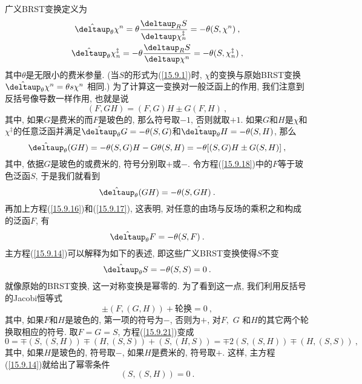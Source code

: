 广义BRST变换定义为
\begin{gather}
\hat{\deltaup}_{\theta }\chi ^{n}=\theta \frac{\deltaup _{R}S}{\deltaup \chi
_{n}^{\ddag }}=-\theta (S,\chi ^{n})\:,   \label{15.9.16} \\
\hat{\deltaup}_{\theta }\chi _{n}^{\ddag }=-\theta \frac{\deltaup _{R}S}{\deltaup
\chi ^{n}}=-\theta (S,\chi _{n}^{\ddag })\:,   \label{15.9.17}
\end{gather}%
其中$\theta $是无限小的费米参量. (当$S$的形式为(\ref{15.9.1})时, $\chi $的变换与原始BRST变换$\hat{\deltaup}_{\theta }\chi ^{n}=\theta s\chi ^{n}$%
相同.) 为了计算这一变换对一般泛函上的作用, 我们注意到反括号像导数一样作用, 也就是说
\begin{equation}
(F,GH)=(F,G)H\pm G(F,H)\:,   \label{15.9.18}
\end{equation}%
其中, 如果$G$是费米的而$F$是玻色的, 那么符号取$-1$, 否则就取$+1$. 
如果$G$和$H$是$\chi$和$\chi ^{\ddag }$的任意泛函并满足$\hat{\deltaup}_{\theta }G=-\theta (S,G)$和$\hat{%
\deltaup}_{\theta }H=-\theta (S,H)$, 那么
\[
\hat{\deltaup}_{\theta }(GH)=-\theta (S,G)H-G\theta (S,H)=-\theta [(S,G)H\pm G(S,H)]\:, 
\]%
其中, 依据$G$是玻色的或费米的, 符号分别取$+$或$-$. 令方程(\ref{15.9.18})中的$F$等于玻色泛函$S$, 于是我们就看到
\[
\hat{\deltaup}_{\theta }(GH)=-\theta (S,GH)\:. 
\]%
再加上方程(\ref{15.9.16})和(\ref{15.9.17}), 这表明, 对任意的由场与反场的乘积之和构成的泛函$F$, 有
\begin{equation}
\hat{\deltaup}_{\theta }F=-\theta (S,F)\:.   \label{15.9.19}
\end{equation}%
主方程(\ref{15.9.14})可以解释为如下的表述, 即这些广义BRST变换使得$S$不变
\begin{equation}
\hat{\deltaup}_{\theta }S=-\theta (S,S)=0\:.   \label{15.9.20}
\end{equation}%
就像原始的BRST变换, 这一对称变换是幂零的. 为了看到这一点, 我们利用反括号的Jacobi恒等式
\begin{equation}
\pm (F,(G,H))+\text{轮换}=0\:,   \label{15.9.21}
\end{equation}%
其中, 如果$F$和$H$是玻色的, 第一项的符号为$-$,
否则为$+$, 对$F,$ $G$%
和$H$的其它两个轮换取相应的符号. 取$F=G=S$, 方程(\ref{15.9.21})变成\[
0=\mp (S,(S,H))\mp (H,(S,S))+(S,(H,S))=\mp 2(S,(S,H))\mp (H,(S,S))\:, 
\]%
其中, 如果$H$是玻色的, 符号取$-$, 如果$H$是费米的, 符号取$+$. 这样, 主方程(\ref{15.9.14})就给出了幂零条件
\begin{equation}
(S,(S,H))=0\:.   \label{15.9.22}
\end{equation}

